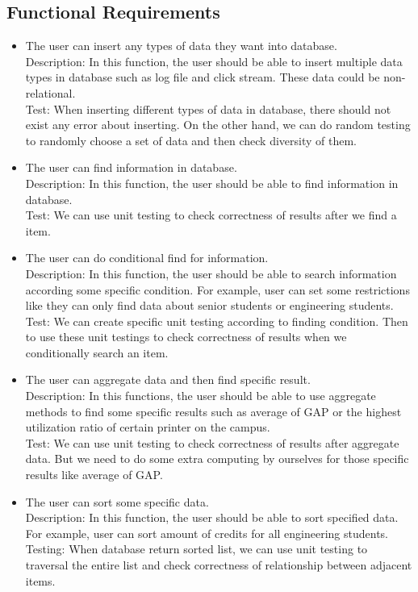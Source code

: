 \documentclass[letterpaper,10pt]{article}
\begin{document}
        \subsection{Functional Requirements}
        \begin{itemize}
        \item The user can insert any types of data they want into database.\\
        Description: In this function, the user should be able to insert multiple data types in database such as log file and click stream. These data could be non-relational.\\
        Test: When inserting different types of data in database, there should not exist any error about inserting. On the other hand, we can do random testing to randomly choose a set of data and then check diversity of them.

        \item The user can find information in database.\\
        Description: In this function, the user should be able to find information in database.\\
        Test: We can use unit testing to check correctness of results after we find a item.

        \item The user can do conditional find for information.\\
        Description: In this function, the user should be able to search information according some specific condition. For example, user can set some restrictions like they can only find data about senior students or engineering students.\\
        Test: We can create specific unit testing according to finding condition. Then to use these unit testings to check correctness of results when we conditionally search an item.

        \item The user can aggregate data and then find specific result.\\
        Description: In this functions, the user should be able to use aggregate methods to find some specific results such as average of GAP or the highest utilization ratio of certain printer on the campus.\\
        Test: We can use unit testing to check correctness of results after aggregate data. But we need to do some extra computing by ourselves for those specific results like average of GAP.
 
        \item The user can sort some specific data.\\
        Description: In this function, the user should be able to sort specified data. For example, user can sort amount of credits for all engineering students.\\
        Testing: When database return sorted list, we can use unit testing to traversal the entire list and check correctness of relationship between adjacent items.
        \end{itemize}
\end{document}
